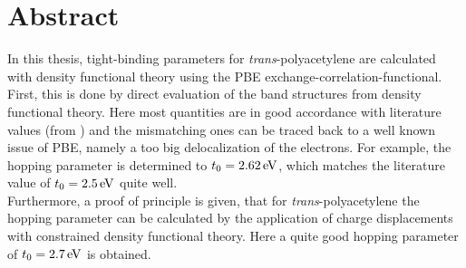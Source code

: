 \chapter*{Abstract}
In this thesis, tight-binding parameters for \emph{trans}-polyacetylene are calculated with density functional theory using the PBE exchange-correlation-functional. First, this is done by direct evaluation of the band structures from density functional theory. Here most quantities are in good accordance with literature values (from \cite{PhysRevLett.42.1698, doi:10.1021/cr990357p}) and the mismatching ones can be traced back to a well known issue of PBE, namely a too big delocalization of the electrons. For example, the hopping parameter is determined to $t_0 = \unit[2.62]{eV}$, which matches the literature value of $t_0 = \unit[2.5]{eV}$ quite well.\\
Furthermore, a proof of principle is given, that for \emph{trans}-polyacetylene the hopping parameter can be calculated by the application of charge displacements with constrained density functional theory. Here a quite good hopping parameter of $t_0 = \unit[2.7]{eV}$ is obtained.

